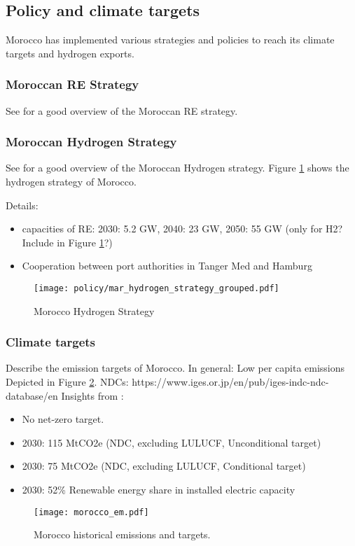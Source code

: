 \subsection{Policy and climate targets}
Morocco has implemented various strategies and policies to reach its climate targets and hydrogen exports. 

\subsubsection{Moroccan RE Strategy}
See \cite[p. 13]{Ersoy2022} for a good overview of the Moroccan RE strategy.

\subsubsection{Moroccan Hydrogen Strategy}
See \cite[p. 14]{Ersoy2022} for a good overview of the Moroccan Hydrogen strategy. Figure \ref{fig:mar_hydrogen_strategy} shows the hydrogen strategy of Morocco.

Details:
\begin{itemize}
    \item capacities of RE: 2030: 5.2 GW, 2040: 23 GW, 2050: 55 GW (only for H2? Include in Figure \ref{fig:mar_hydrogen_strategy}?)
    \item Cooperation between port authorities in Tanger Med and Hamburg
\end{itemize}

\begin{figure}
    \centering
    \texttt{[image: policy/mar\_hydrogen\_strategy\_grouped.pdf]}
    \caption{Morocco Hydrogen Strategy}
    \label{fig:mar_hydrogen_strategy}
\end{figure}

\subsubsection{Climate targets}
Describe the emission targets of Morocco. In general: Low per capita emissions
Depicted in Figure \ref{fig:morocco_em}.
NDCs: https://www.iges.or.jp/en/pub/iges-indc-ndc-database/en 
Insights from \cite{CAT2021}:
\begin{itemize}
    \item No net-zero target.
    \item 2030: 115 MtCO2e (NDC, excluding LULUCF, Unconditional target)
    \item 2030: 75 MtCO2e (NDC, excluding LULUCF, Conditional target)
    \item 2030: 52\% Renewable energy share in installed electric capacity
\end{itemize}

\begin{figure}[h!]
    \centering
    \texttt{[image: morocco\_em.pdf]}
    \caption{Morocco historical emissions and targets.}
    \label{fig:morocco_em}
\end{figure}